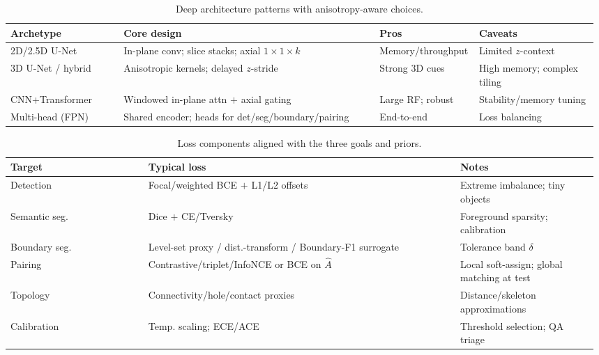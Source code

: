 \medskip
\begin{table}[t]
  \centering
  \scriptsize
  \setlength{\tabcolsep}{2pt}\renewcommand{\arraystretch}{1.05}
  \begin{tabular}{@{} p{0.19\linewidth} p{0.43\linewidth} p{0.16\linewidth} p{0.20\linewidth} @{}}
    \hline
    \textbf{Archetype} & \textbf{Core design} & \textbf{Pros} & \textbf{Caveats} \\
    \hline
    2D/2.5D U-Net & In-plane conv; slice stacks; axial \(1\times 1\times k\) & Memory/throughput & Limited \(z\)-context \\
    3D U-Net / hybrid & Anisotropic kernels; delayed \(z\)-stride & Strong 3D cues & High memory; complex tiling \\
    CNN+Transformer & Windowed in-plane attn \(+\) axial gating & Large RF; robust & Stability/memory tuning \\
    Multi-head (FPN) & Shared encoder; heads for det/seg/boundary/pairing & End-to-end & Loss balancing \\
    \hline
  \end{tabular}
  \caption{Deep architecture patterns with anisotropy-aware choices.}
  \label{tab:dl-arch-compare}
\end{table}

\begin{table}[t]
  \centering
  \scriptsize
  \setlength{\tabcolsep}{2pt}\renewcommand{\arraystretch}{1.05}
  \begin{tabular}{@{} p{0.23\linewidth} p{0.52\linewidth} p{0.23\linewidth} @{}}
    \hline
    \textbf{Target} & \textbf{Typical loss} & \textbf{Notes} \\
    \hline
    Detection & Focal/weighted BCE \(+\) L1/L2 offsets & Extreme imbalance; tiny objects \\
    Semantic seg. & Dice \(+\) CE/Tversky & Foreground sparsity; calibration \\
    Boundary seg. & Level-set proxy / dist.-transform / Boundary-F1 surrogate & Tolerance band \(\delta\) \\
    Pairing & Contrastive/triplet/InfoNCE or BCE on \(\hat{A}\) & Local soft-assign; global matching at test \\
    Topology & Connectivity/hole/contact proxies & Distance/skeleton approximations \\
    Calibration & Temp. scaling; ECE/ACE & Threshold selection; QA triage \\
    \hline
  \end{tabular}
  \caption{Loss components aligned with the three goals and priors.}
  \label{tab:dl-loss-compare}
\end{table}

